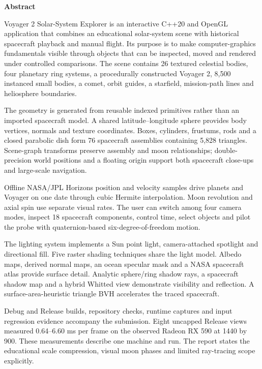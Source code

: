 \documentclass[12pt,a4paper,oneside]{report}
\newcommand{\frontheading}[1]{\begin{center}\bfseries\fontsize{16}{24}\selectfont #1\end{center}\vspace{18pt}}
\newcommand{\para}[1]{\par\vspace{12pt}\noindent#1\par}
\newcommand{\manualpage}{\clearpage}
\begin{document}
\frontheading{Abstract}
\para{Voyager 2 Solar-System Explorer is an interactive C++20 and OpenGL application that combines an educational solar-system scene with historical spacecraft playback and manual flight. Its purpose is to make computer-graphics fundamentals visible through objects that can be inspected, moved and rendered under controlled comparisons. The scene contains 26 textured celestial bodies, four planetary ring systems, a procedurally constructed Voyager 2, 8,500 instanced small bodies, a comet, orbit guides, a starfield, mission-path lines and heliosphere boundaries.}
\para{The geometry is generated from reusable indexed primitives rather than an imported spacecraft model. A shared latitude--longitude sphere provides body vertices, normals and texture coordinates. Boxes, cylinders, frustums, rods and a closed parabolic dish form 76 spacecraft assemblies containing 5,828 triangles. Scene-graph transforms preserve assembly and moon relationships; double-precision world positions and a floating origin support both spacecraft close-ups and large-scale navigation.}
\para{Offline NASA/JPL Horizons position and velocity samples drive planets and Voyager on one date through cubic Hermite interpolation. Moon revolution and axial spin use separate visual rates. The user can switch among four camera modes, inspect 18 spacecraft components, control time, select objects and pilot the probe with quaternion-based six-degree-of-freedom motion.}
\para{The lighting system implements a Sun point light, camera-attached spotlight and directional fill. Five raster shading techniques share the light model. Albedo maps, derived normal maps, an ocean specular mask and a NASA spacecraft atlas provide surface detail. Analytic sphere/ring shadow rays, a spacecraft shadow map and a hybrid Whitted view demonstrate visibility and reflection. A surface-area-heuristic triangle BVH accelerates the traced spacecraft.}
\para{Debug and Release builds, repository checks, runtime captures and input regression evidence accompany the submission. Eight uncapped Release views measured 0.64--6.60 ms per frame on the observed Radeon RX 590 at 1440 by 900. These measurements describe one machine and run. The report states the educational scale compression, visual moon phases and limited ray-tracing scope explicitly.}
\manualpage
\end{document}
